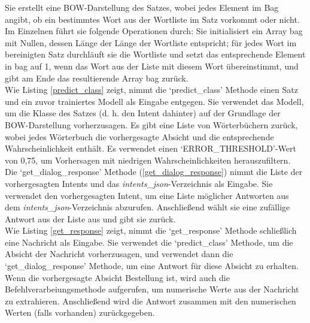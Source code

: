 Sie erstellt eine \ac{BOW}-Darstellung des Satzes, wobei jedes Element im Bag angibt, ob ein bestimmtes Wort aus der Wortliste im Satz vorkommt oder nicht. 
Im Einzelnen führt sie folgende Operationen durch: 
Sie initialisiert ein Array bag mit Nullen, dessen Länge der Länge der Wortliste entspricht; für jedes Wort im bereinigten Satz durchläuft sie die Wortliste und setzt das entsprechende Element in bag auf 1, wenn das Wort aus der Liste mit diesem Wort übereinstimmt, und gibt am Ende das resultierende Array bag zurück.\\

Wie Listing \ref{predict_class} zeigt, nimmt die `predict\_class' Methode einen Satz und ein zuvor trainiertes Modell als Eingabe entgegen. 
Sie verwendet das Modell, um die Klasse des Satzes (d. h. den Intent dahinter) auf der Grundlage der \ac{BOW}-Darstellung vorherzusagen. 
Es gibt eine Liste von Wörterbüchern zurück, wobei jedes Wörterbuch die vorhergesagte Absicht und die entsprechende Wahrscheinlichkeit enthält.
Es verwendet einen `ERROR\_THRESHOLD'-Wert von 0,75, um Vorhersagen mit niedrigen Wahrscheinlichkeiten herauszufiltern.\\

Die `get\_dialog\_response' Methode (\ref{get_dialog_response}) nimmt die Liste der vorhergesagten Intents und das \textit{intents\_json}-Verzeichnis als Eingabe. 
Sie verwendet den vorhergesagten Intent, um eine Liste möglicher Antworten aus dem \textit{intents\_json}-Verzeichnis abzurufen. 
Anschließend wählt sie eine zufällige Antwort aus der Liste aus und gibt sie zurück.\\

Wie Listing \ref{get_response} zeigt, nimmt die `get\_response' Methode schließlich eine Nachricht als Eingabe. 
Sie verwendet die `predict\_class' Methode, um die Absicht der Nachricht vorherzusagen, und verwendet dann die `get\_dialog\_response' Methode, um eine Antwort für diese Absicht zu erhalten. 
Wenn die vorhergesagte Absicht \glqq{}Bestellung\grqq{} ist, wird auch die Befehlverarbeiungsmethode aufgerufen, um numerische Werte aus der Nachricht zu extrahieren. 
Anschließend wird die Antwort zusammen mit den numerischen Werten (falls vorhanden) zurückgegeben.
